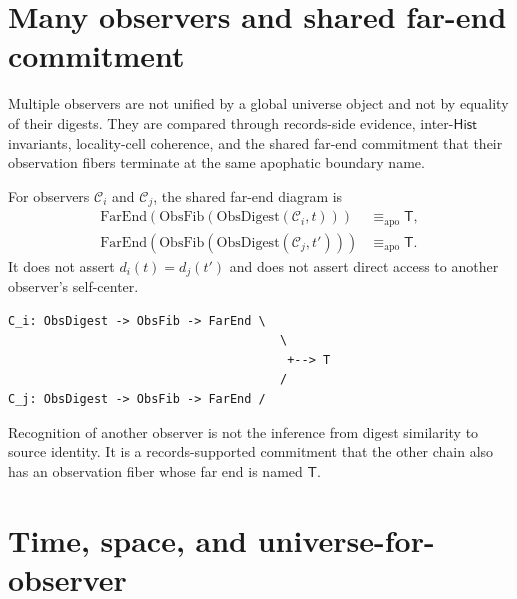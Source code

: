 \section{Many observers and shared far-end commitment}
\label{sec:far-end-diagrammatics-many-observers}

Multiple observers are not unified by a global universe object and not by
equality of their digests. They are compared through records-side evidence,
inter-$\mathsf{Hist}$ invariants, locality-cell coherence, and the shared
far-end commitment that their observation fibers terminate at the same
apophatic boundary name.

\begin{definition}
\label{def:far-end-shared-diagram}
For observers $\mathcal{C}_i$ and $\mathcal{C}_j$, the shared far-end diagram
is
$$
\begin{aligned}
\mathrm{FarEnd}(\mathrm{ObsFib}(\mathrm{ObsDigest}(\mathcal{C}_i,t)))
&\equiv_{\mathrm{apo}} \mathsf{T},\\
\mathrm{FarEnd}(\mathrm{ObsFib}(\mathrm{ObsDigest}(\mathcal{C}_j,t')))
&\equiv_{\mathrm{apo}} \mathsf{T}.
\end{aligned}
$$
It does not assert $d_i(t)=d_j(t')$ and does not assert direct access to
another observer's self-center.
\end{definition}

\begin{center}
\begin{minipage}{0.92\textwidth}
\begin{verbatim}
C_i: ObsDigest -> ObsFib -> FarEnd \
                                      \
                                       +--> T
                                      /
C_j: ObsDigest -> ObsFib -> FarEnd /
\end{verbatim}
\end{minipage}
\end{center}

\begin{principle}
\label{prin:far-end-other-minds-not-digest-collisions}
Recognition of another observer is not the inference from digest similarity
to source identity. It is a records-supported commitment that the other chain
also has an observation fiber whose far end is named $\mathsf{T}$.
\end{principle}

\section{Time, space, and universe-for-observer}
\label{sec:far-end-diagrammatics-time-space-universe}


